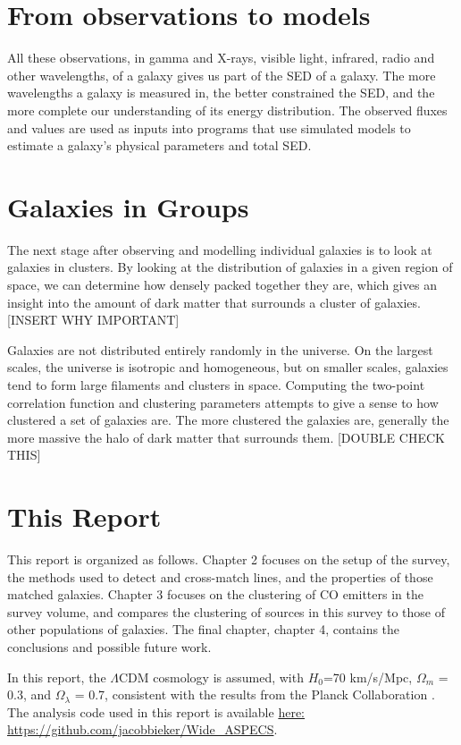\documentclass[twoside,single]{lion-msc}
\begin{document}
\section{From observations to models}

All these observations, in gamma and X-rays, visible light, infrared, radio and other wavelengths, of a galaxy gives us part of the SED of a galaxy. The more wavelengths a galaxy is measured in, the better constrained the SED, and the more complete our understanding of its energy distribution. The observed fluxes and values are used as inputs into programs that use simulated models to estimate a galaxy's physical parameters and total SED.

\section{Galaxies in Groups}

The next stage after observing and modelling individual galaxies is to look at galaxies in clusters. By looking at the distribution of galaxies in a given region of space, we can determine how densely packed together they are, which gives an insight into the amount of dark matter that surrounds a cluster of galaxies. [INSERT WHY IMPORTANT]

Galaxies are not distributed entirely randomly in the universe. On the largest scales, the universe is isotropic and homogeneous, but on smaller scales, galaxies tend to form large filaments and clusters in space. Computing the two-point correlation function and clustering parameters attempts to give a sense to how clustered a set of galaxies are. The more clustered the galaxies are, generally the more massive the halo of dark matter that surrounds them. [DOUBLE CHECK THIS]

\section{This Report}

This report is organized as follows. Chapter 2 focuses on the setup of the survey, the methods used to detect and cross-match lines, and the properties of those matched galaxies. Chapter 3 focuses on the clustering of CO emitters in the survey volume, and compares the clustering of sources in this survey to those of other populations of galaxies. The final chapter, chapter 4, contains the conclusions and possible future work. 

In this report, the $\Lambda$CDM cosmology is assumed, with $H_0$=70 km/s/Mpc, $\Omega_m$ = 0.3, and $\Omega_{\lambda}$ = 0.7, consistent with the results from the Planck Collaboration \cite{ade2016planck}. The analysis code used in this report is available \href{https://github.com/jacobbieker/Wide\_ASPECS}{here: https://github.com/jacobbieker/Wide\_ASPECS}. 
\end{document}
